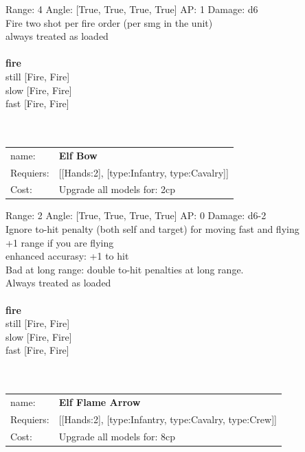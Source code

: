 Range: 4  Angle: [True, True, True, True] AP: 1 Damage: d6 \\
Fire two shot per fire order (per smg in the unit)\\ 
always treated as loaded\\ 







\ \\ {\bf fire } \\
still [Fire, Fire] \\
slow [Fire, Fire] \\
fast [Fire, Fire] \\

\ \\
\ \\
\begin{tabular}{ll}
name: & {\bf Elf Bow } \\
Requiers: & [[Hands:2], [type:Infantry, type:Cavalry]] \\
Cost: & Upgrade all models for: 2cp \\
\end{tabular}



Range: 2  Angle: [True, True, True, True] AP: 0 Damage: d6-2 \\
Ignore to-hit penalty (both self and target) for moving fast and flying\\ 
+1 range if you are flying\\ 
enhanced accurasy: +1 to hit\\ 
Bad at long range: double to-hit penalties at long range.\\ 
Always treated as loaded\\ 







\ \\ {\bf fire } \\
still [Fire, Fire] \\
slow [Fire, Fire] \\
fast [Fire, Fire] \\

\ \\
\ \\
\begin{tabular}{ll}
name: & {\bf Elf Flame Arrow } \\
Requiers: & [[Hands:2], [type:Infantry, type:Cavalry, type:Crew]] \\
Cost: & Upgrade all models for: 8cp \\
\end{tabular}



